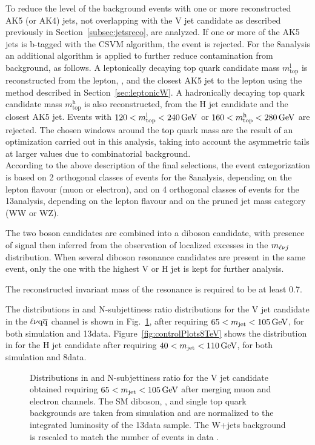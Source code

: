 To reduce the level of the \ttbar background events with one or more reconstructed AK5 (or AK4) jets, not overlapping with the V jet candidate
as described previously in Section~\ref{subsec:jetsreco}, are analyzed. If one or more of the AK5 jets
is b-tagged with the CSVM algorithm, the event is rejected.
For the 8\TeV analysis an additional algorithm is applied to further reduce contamination from \ttbar background, as follows.
A leptonically decaying top quark candidate mass $m_\mathrm{top}^\mathrm{l}$ is reconstructed from the lepton, \ETmiss, and the closest AK5 jet to the lepton using the method described in Section~\ref{sec:leptonicW}.
A hadronically decaying top quark candidate mass $m_\mathrm{top}^\mathrm{h}$ is also reconstructed, from the H jet candidate and the closest AK5 jet.
Events with $120 < m_\mathrm{top}^\mathrm{l} < 240\,\text{Ge\hspace{-.08em}V}$ or $160 < m_\mathrm{top}^\mathrm{h} < 280\,\text{Ge\hspace{-.08em}V}$ are rejected.
The chosen windows around the top quark mass are the result of an optimization carried out in this analysis, taking into account
the asymmetric tails at larger values due to combinatorial background.\\

According to the above description of the final selections, the event categorization is based on 2 orthogonal classes of events for the 8\TeV analysis, depending on the lepton flavour (muon or electron),
and on 4 orthogonal classes of events for the 13\TeV analysis, depending on the lepton flavour and on the pruned jet mass category (WW or WZ).

The two boson candidates are combined into a diboson candidate, with presence of signal then inferred from the observation of localized excesses in the $m_{\ell\nu j}$ distribution.
When several diboson resonance candidates are present in the same event, only the one with the highest \pt
V or H jet is kept for further analysis.

The reconstructed invariant mass of the resonance is required to be at least 0.7\TeV. 

The distributions in \pt and N-subjettiness ratio \nsubj distributions for the V jet candidate in the $\ell\nu\mathrm{q}\overline{\mathrm{q}}$ channel is shown in Fig.~\ref{fig:controlPlots13TeV},
after requiring $65 < m_{\text{jet}} < 105\,\text{Ge\hspace{-.08em}V}$, for both simulation and 13\TeV data.  Figure~\ref{fig:controlPlots8TeV} shows the distribution in \pt for the H jet candidate
after requiring $40 < m_{\text{jet}} < 110\,\text{Ge\hspace{-.08em}V}$, for both simulation and 8\TeV data.

\begin{figure}[!htb]
\centering
{}
\caption{Distributions in \pt and N-subjettiness ratio \nsubj for the V jet candidate obtained requiring $65 < m_{\text{jet}} < 105\,\text{Ge\hspace{-.08em}V}$ after merging muon and electron channels. The SM diboson, \ttbar, and single top quark backgrounds are taken from simulation and are normalized to the integrated luminosity of the 13\TeV data sample. The W+jets background is rescaled to match the number of events in data .}
\label{fig:controlPlots13TeV}
\end{figure}

